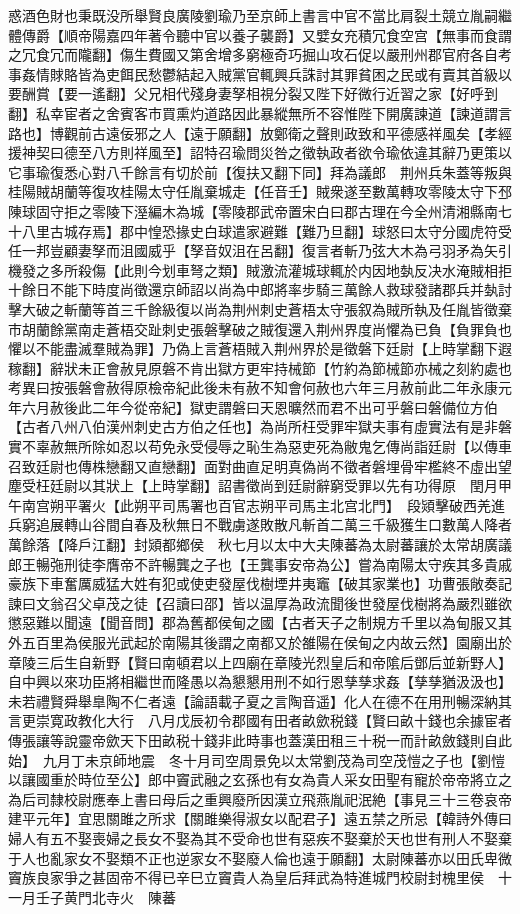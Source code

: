 惑酒色財也秉既没所舉賢良廣陵劉瑜乃至京師上書言中官不當比肩裂土競立胤嗣繼體傳爵【順帝陽嘉四年著令聽中官以養子襲爵】又嬖女充積冗食空宫【無事而食謂之冗食冗而隴翻】傷生費國又第舍增多窮極奇巧掘山攻石促以嚴刑州郡官府各自考事姦情賕賂皆為吏餌民愁鬱結起入賊黨官輒興兵誅討其罪貧困之民或有賣其首級以要酬賞【要一遙翻】父兄相代殘身妻孥相視分裂又陛下好微行近習之家【好呼到翻】私幸宦者之舍賓客市買熏灼道路因此暴縱無所不容惟陛下開廣諫道【諫道謂言路也】博觀前古遠佞邪之人【遠于願翻】放鄭衛之聲則政致和平德感祥風矣【孝經援神契曰德至八方則祥風至】詔特召瑜問災咎之徵執政者欲令瑜依違其辭乃更策以它事瑜復悉心對八千餘言有切於前【復扶又翻下同】拜為議郎　荆州兵朱蓋等叛與桂陽賊胡蘭等復攻桂陽太守任胤棄城走【任音壬】賊衆遂至數萬轉攻零陵太守下邳陳球固守拒之零陵下溼編木為城【零陵郡武帝置宋白曰郡古理在今全州清湘縣南七十八里古城存焉】郡中惶恐掾史白球遣家避難【難乃旦翻】球怒曰太守分國虎符受任一邦豈顧妻孥而沮國威乎【孥音奴沮在呂翻】復言者斬乃弦大木為弓羽矛為矢引機發之多所殺傷【此則今划車弩之類】賊激流灌城球輒於内因地埶反决水淹賊相拒十餘日不能下時度尚徵還京師詔以尚為中郎將率步騎三萬餘人救球發諸郡兵并埶討擊大破之斬蘭等首三千餘級復以尚為荆州刺史蒼梧太守張叙為賊所執及任胤皆徵棄市胡蘭餘黨南走蒼梧交趾刺史張磐擊破之賊復還入荆州界度尚懼為已負【負罪負也懼以不能盡滅羣賊為罪】乃偽上言蒼梧賊入荆州界於是徵磐下廷尉【上時掌翻下遐稼翻】辭狀未正會赦見原磐不肯出獄方更牢持械節【竹約為節械節亦械之刻約處也　考異曰按張磐會赦得原檢帝紀此後未有赦不知會何赦也六年三月赦前此二年永康元年六月赦後此二年今從帝紀】獄吏謂磐曰天恩曠然而君不出可乎磐曰磐備位方伯【古者八州八伯漢州刺史古方伯之任也】為尚所枉受罪牢獄夫事有虛實法有是非磐實不辜赦無所除如忍以苟免永受侵辱之恥生為惡吏死為敝鬼乞傳尚詣廷尉【以傳車召致廷尉也傳株戀翻又直戀翻】面對曲直足明真偽尚不徵者磐埋骨牢檻終不虛出望塵受枉廷尉以其狀上【上時掌翻】詔書徵尚到廷尉辭窮受罪以先有功得原　閏月甲午南宫朔平署火【此朔平司馬署也百官志朔平司馬主北宫北門】　段熲擊破西羌進兵窮追展轉山谷間自春及秋無日不戰虜遂敗散凡斬首二萬三千級獲生口數萬人降者萬餘落【降戶江翻】封熲都鄉侯　秋七月以太中大夫陳蕃為太尉蕃讓於太常胡廣議郎王暢㢮刑徒李膺帝不許暢龔之子也【王龔事安帝為公】嘗為南陽太守疾其多貴戚豪族下車奮厲威猛大姓有犯或使吏發屋伐樹堙井夷竈【破其家業也】功曹張敞奏記諫曰文翁召父卓茂之徒【召讀曰邵】皆以温厚為政流聞後世發屋伐樹將為嚴烈雖欲懲惡難以聞遠【聞音問】郡為舊都侯甸之國【古者天子之制規方千里以為甸服又其外五百里為侯服光武起於南陽其後謂之南都又於雒陽在侯甸之内故云然】園廟出於章陵三后生自新野【賢曰南頓君以上四廟在章陵光烈皇后和帝隂后鄧后並新野人】自中興以來功臣將相繼世而隆愚以為懇懇用刑不如行恩孳孳求姦【孳孳猶汲汲也】未若禮賢舜舉臯陶不仁者遠【論語載子夏之言陶音遥】化人在德不在用刑暢深納其言更崇寛政教化大行　八月戊辰初令郡國有田者畝歛税錢【賢曰畝十錢也余據宦者傳張讓等說靈帝歛天下田畝税十錢非此時事也蓋漢田租三十税一而計畝斂錢則自此始】　九月丁未京師地震　冬十月司空周景免以太常劉茂為司空茂愷之子也【劉愷以讓國重於時位至公】郎中竇武融之玄孫也有女為貴人采女田聖有寵於帝帝將立之為后司隸校尉應奉上書曰母后之重興廢所因漢立飛燕胤祀泯絶【事見三十三卷哀帝建平元年】宜思關雎之所求【關雎樂得淑女以配君子】遠五禁之所忌【韓詩外傳曰婦人有五不娶喪婦之長女不娶為其不受命也世有惡疾不娶棄於天也世有刑人不娶棄于人也亂家女不娶類不正也逆家女不娶廢人倫也遠于願翻】太尉陳蕃亦以田氏卑微竇族良家爭之甚固帝不得已辛巳立竇貴人為皇后拜武為特進城門校尉封槐里侯　十一月壬子黄門北寺火　陳蕃